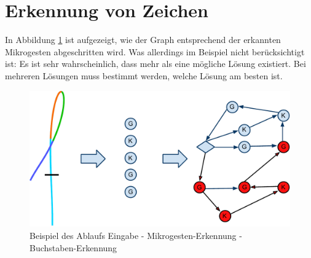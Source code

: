 \section{Erkennung von Zeichen}

In Abbildung \ref{beispiel_graph_ablauf} ist aufgezeigt, wie der Graph entsprechend der erkannten Mikrogesten abgeschritten wird. Was allerdings im Beispiel nicht berücksichtigt ist: Es ist sehr wahrscheinlich, dass mehr als eine mögliche Lösung existiert. Bei mehreren Lösungen muss bestimmt werden, welche Lösung am besten ist. 

\begin{figure}[h!]
  \centering
    \includegraphics[width=\textwidth]{./img/graph_ablauf_beispiel.pdf}
  \caption{Beispiel des Ablaufs Eingabe - Mikrogesten-Erkennung - Buchstaben-Erkennung}
  \label{beispiel_graph_ablauf}
\end{figure}
